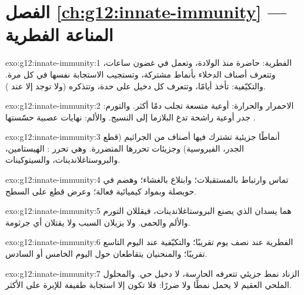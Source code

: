 \section*{الفصل \ref{ch:g12:innate-immunity} --- المناعة الفطرية}

\begin{solution}{exo:g12:innate-immunity:1}
الفطرية: حاضرة منذ الولادة، وتعمل في غضون ساعات، وتتعرف أصناف الدخلاء
بأنماط مشتركة، وتستجيب الاستجابة نفسها في كل مرة. والتكيّفية: تأخذ
أيامًا، وتتعرف كل دخيل على حدة، وتتذكره (ولا توجد إلا عند ).
\end{solution}

\begin{solution}{exo:g12:innate-immunity:2}
الاحمرار والحرارة: أوعية متسعة تجلب دمًا أكثر. والتورم: جدر أوعية
راشحة تدع البلازما إلى النسيج. والألم: نهايات عصبية حسّستها .
\end{solution}

\begin{solution}{exo:g12:innate-immunity:3}
أنماطًا جزيئية تشترك فيها أصناف من الجراثيم (قطع الجدر، 
الفيروسية) وجزيئات تحررها  المتضررة. وهي تحرر :
الهيستامين، والبروستاغلاندينات، والسيتوكينات.
\end{solution}

\begin{solution}{exo:g12:innate-immunity:4}
تماس وارتباط بالمستقبلات؛ وابتلاع بالغشاء؛ وهضم في حويصلة 
وبمواد كيميائية فعالة؛ وعرض قطع  على السطح.
\end{solution}

\begin{solution}{exo:g12:innate-immunity:5}
هما يسدان  الذي يصنع البروستاغلاندينات، فيقللان التورم والألم
والحمى. ولا يزيلان السبب ولا يقتلان أي جرثومة.
\end{solution}

\begin{solution}{exo:g12:innate-immunity:6}
الفطرية عند نصف يوم تقريبًا؛ والتكيّفية عند اليوم التاسع تقريبًا؛
والمنحنيان يتقاطعان حول اليوم الخامس أو السادس.
\end{solution}

\begin{solution}{exo:g12:innate-immunity:7}
الزناد نمط جزيئي تتعرفه  الحارسة، لا دخيل حي. والمحلول الملحي
العقيم لا يحمل نمطًا ولا ضررًا: فلا تكون إلا استجابة طفيفة للإبرة على
الأكثر.
\end{solution}

